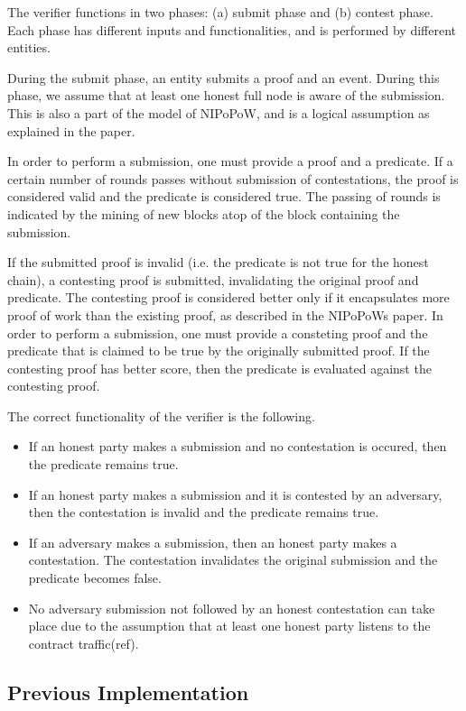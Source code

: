 \documentclass{article}
\begin{document}
  The verifier functions in two phases: (a) submit phase and (b) contest
  phase. Each phase has different inputs and functionalities, and is
  performed by different entities.

  During the submit phase, an entity submits a proof and an event.
  During this phase, we assume that at least one honest full node is
  aware of the submission. This is also a part of the model of NIPoPoW,
  and is a logical assumption as explained in the paper.

  In order to perform a submission, one must provide a proof and a
  predicate. If a certain number of rounds passes without submission of
  contestations, the proof is considered valid and the predicate is
  considered true. The passing of rounds is indicated by the mining of
  new blocks atop of the block containing the submission.

  If the submitted proof is invalid (i.e. the predicate is not true for
  the honest chain), a contesting proof is submitted, invalidating the
  original proof and predicate. The contesting proof is considered
  better only if it encapsulates more proof of work than the existing
  proof, as described in the NIPoPoWs paper. In order to perform a
  submission, one must provide a consteting proof and the predicate that
  is claimed to be true by the originally submitted proof. If the
  contesting proof has better score, then the predicate is evaluated
  against the contesting proof.

  The correct functionality of the verifier is the following.
  \begin{itemize}
  \item
    If an honest party makes a submission and no contestation is
    occured, then the predicate remains true.
  \item
    If an honest party makes a submission and it is contested by an
    adversary, then the contestation is invalid and the predicate
    remains true.
  \item
    If an adversary makes a submission, then an honest party makes a
    contestation. The contestation invalidates the original submission
    and the predicate becomes false.
  \item
    No adversary submission not followed by an honest contestation can
    take place due to the assumption that at least one honest party
    listens to the contract traffic(ref).
  \end{itemize}

  \subsection{Previous Implementation}
\end{document}
